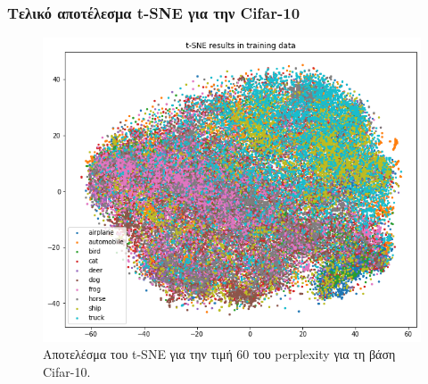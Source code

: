 \documentclass{beamer}
\begin{document}
\begin{frame}
\frametitle{Τελικό αποτέλεσμα t-SNE για την Cifar-10}

\begin{figure}[H]
    \centering
    \includegraphics[width=0.6\linewidth]{cifar/tsne_training.png}
    \caption{Αποτελέσμα του t-SNE για την τιμή 60 του perplexity για τη βάση
    Cifar-10.}
    \label{fig:cifar_tsne}
\end{figure}

\end{frame}
\end{document}
